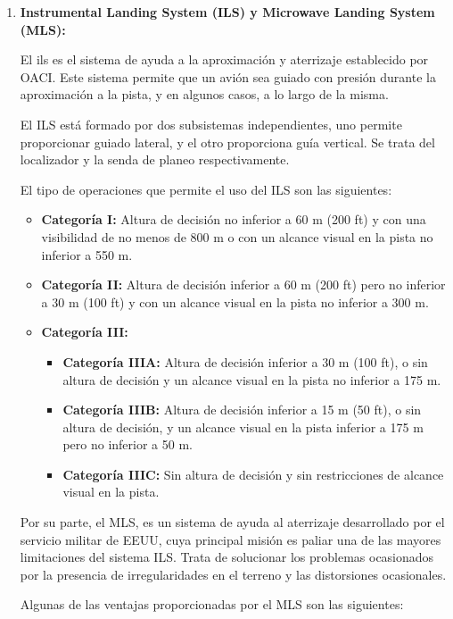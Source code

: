 \begin{enumerate}
    \item \textbf{Instrumental Landing System (ILS) y Microwave Landing System (MLS):}
    
    El \acrfull{ils} es el sistema de ayuda a la aproximación y aterrizaje establecido por OACI. Este sistema permite que un avión sea guiado con presión durante la aproximación a la pista, y en algunos casos, a lo largo de la misma.

    El ILS está formado por dos subsistemas independientes, uno permite proporcionar guiado lateral, y el otro proporciona guía vertical. Se trata del localizador y la senda de planeo respectivamente.
    
    El tipo de operaciones que permite el uso del ILS son las siguientes:
    
    \begin{itemize}
        \item \textbf{Categoría I:} Altura de decisión no inferior a 60 m (200 ft) y con una visibilidad de no menos de 800 m o con un alcance visual en la pista no inferior a 550 m.
        \item \textbf{Categoría II:} Altura de decisión inferior a 60 m (200 ft) pero no inferior a 30 m (100 ft) y con un alcance visual en la pista no inferior a 300 m.
        \item \textbf{Categoría III:}
        \begin{itemize}
            \item \textbf{Categoría IIIA:} Altura de decisión inferior a 30 m (100 ft), o sin altura de decisión y un alcance visual en la pista no inferior a 175 m.
            \item \textbf{Categoría IIIB:} Altura de decisión inferior a 15 m (50 ft), o sin altura de decisión, y un alcance visual en la pista inferior a 175 m pero no inferior a 50 m.
            \item \textbf{Categoría IIIC:} Sin altura de decisión y sin restricciones de alcance visual en la pista.
        \end{itemize}
    \end{itemize}
    
    Por su parte, el MLS, es un sistema de ayuda al aterrizaje desarrollado por el servicio militar de EEUU, cuya principal misión es paliar una de las mayores limitaciones del sistema ILS. Trata de solucionar los problemas ocasionados por la presencia de irregularidades en el terreno y las distorsiones ocasionales.
    
    Algunas de las ventajas proporcionadas por el MLS son las siguientes:
    

\end{enumerate}
